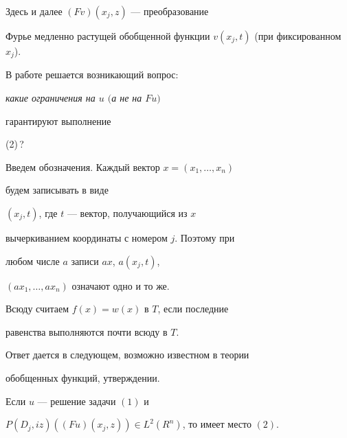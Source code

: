 Здесь и далее $(F v) (x_{j}, z)$ --- преобразование


Фурье медленно растущей обобщенной функции $v(x_{j}, 


t)$ (при фиксированном $x_{j}$). 





В работе решается возникающий вопрос:


{\em какие ограничения на $u$ $($а не на $F u)$


гарантируют выполнение} (2)\,?





Введем обозначения. Каждый вектор $x=(x_{1},\dotsc, x_{n})$


будем записывать в виде


$ (x_{j}, t)$, где $ t $ --- вектор, получающийся из $x$


вычеркиванием координаты с номером $ j $. Поэтому при


любом числе $a$ записи $ ax$, $ a(x_{j}, t)$,


$ (ax_{1},\dotsc, ax_{n}) $ означают одно и то же. 





Всюду считаем $f(x)=w(x)$ в $T$, если последние


равенства выполняются почти всюду в $T$.





Ответ дается в следующем, возможно известном в теории 


обобщенных функций, утверждении.





\begin{thm}


Если $u$ --- решение задачи $(1)$ и


$ P(D_{j}, iz)((F u) (x_{j}, z)) \in L^{2}


(R^{n})$, то имеет место $(2)$. 


\end{thm}





